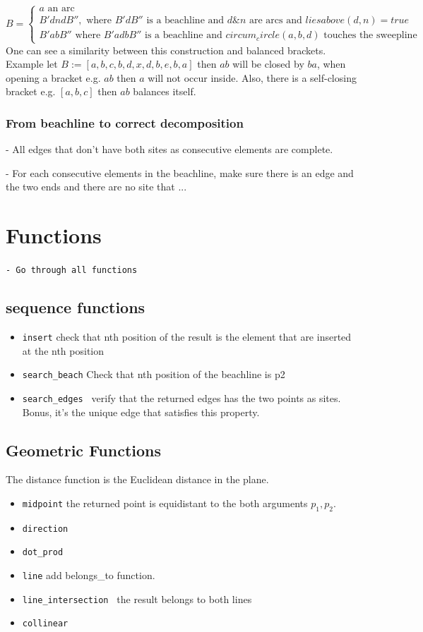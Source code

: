 \documentclass{article}
\begin{document}
 $B =  \begin{cases}
    a \text{ an arc} \\
    B'dndB'', \text{ where } B'dB'' \text{ is a beachline and } d \& n \text{ are arcs and  } liesabove(d, n) = true \\
    B'abB'' \text{ where } B'adbB'' \text{ is a beachline and } circum_circle(a, b, d) \text{ touches the sweepline}  
  \end{cases} $
One can see a similarity between this construction and balanced brackets. %
Example let $ B := \left[a, b, c, b, d, x, d, b, e, b, a \right]$ then $ab$ will be closed by $ba$,  when opening a bracket e.g. $ab$ then $a$ will not occur inside. Also, there is a self-closing bracket e.g. $[a, b, c]$ then $ab$ balances itself.

\subsubsection{From beachline to correct decomposition}
- All edges that don't have both sites as consecutive elements are complete.


- For each consecutive elements in the beachline, make sure there is an edge and the two ends and there are no site that ...



\section{Functions}
{\color{red} \tt - Go through all functions}
\subsection{sequence functions}
\begin{itemize}
    \item {\tt insert} check that nth position of the result is the element that are inserted at the nth position
    \item {\tt search\_beach} Check that nth position of the beachline is p2
    \item {\tt search\_edges } verify that the returned edges has the two points as sites. Bonus, it's the unique edge that satisfies this property. 
    
\end{itemize}
\subsection{Geometric Functions}
The distance function is the Euclidean distance in the plane. 
\begin{itemize}
    \item {\tt midpoint} the returned point is equidistant to the both arguments $p_1, p_2$. 
    \item {\tt direction} 
    \item {\tt dot\_prod}
    \item {\tt line} add belongs\_to function.
    \item {\tt line\_intersection } the result belongs to both lines
    \item {\tt collinear} 
\end{itemize}
\end{document}
